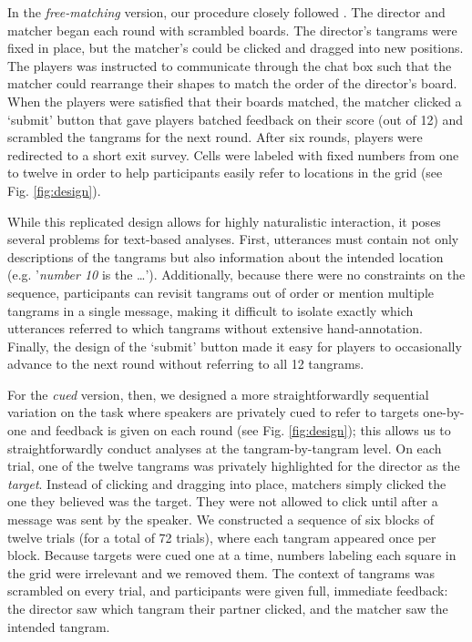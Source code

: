 \documentclass[alpha-refs]{wiley-article}
\begin{document}
In the \emph{free-matching} version, our procedure closely followed \cite{ClarkWilkesGibbs86_ReferringCollaborative}. 
The director and matcher began each round with scrambled boards. 
The director's tangrams were fixed in place, but the matcher's could be clicked and dragged into new positions.
The players was instructed to communicate through the chat box such that the matcher could rearrange their shapes to match the order of the director's board.
When the players were satisfied that their boards matched, the matcher clicked a `submit' button that gave players batched feedback on their score (out of 12) and scrambled the tangrams for the next round. 
After six rounds, players were redirected to a short exit survey. 
Cells were labeled with fixed numbers from one to twelve in order to help participants easily refer to locations in the grid (see Fig. \ref{fig:design}).

While this replicated design allows for highly naturalistic interaction, it poses several problems for text-based analyses. 
First, utterances must contain not only descriptions of the tangrams but also information about the intended location (e.g. '\emph{number 10} is the \dots'). 
Additionally, because there were no constraints on the sequence, participants can revisit tangrams out of order or mention multiple tangrams in a single message, making it difficult to isolate exactly which utterances referred to which tangrams without extensive hand-annotation. 
Finally, the design of the `submit' button made it easy for players to occasionally advance to the next round without referring to all 12 tangrams. 

For the \emph{cued} version, then, we designed a more straightforwardly sequential variation on the task where speakers are privately cued to refer to targets one-by-one and feedback is given on each round (see Fig. \ref{fig:design}); this allows us to straightforwardly conduct analyses at the tangram-by-tangram level. 
On each trial, one of the twelve tangrams was privately highlighted for the director as the \emph{target}. 
Instead of clicking and dragging into place, matchers simply clicked the one they believed was the target. 
They were not allowed to click until after a message was sent by the speaker.  
We constructed a sequence of six blocks of twelve trials (for a total of 72 trials), where each tangram appeared once per block.
Because targets were cued one at a time, numbers labeling each square in the grid were irrelevant and we removed them. 
The context of tangrams was scrambled on every trial, and participants were given full, immediate feedback: the director saw which tangram their partner clicked, and the matcher saw the intended tangram.
\end{document}
